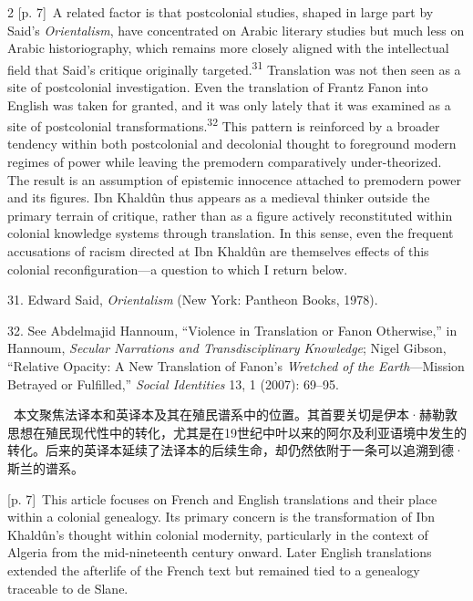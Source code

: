 \documentclass[10pt,a4paper]{article}
\begin{document}
\begin{paracol}{2}
\switchcolumn
{\scriptsize\color{gray} [p. 7]}\ A related factor is that postcolonial studies, shaped in large part by Said’s \textit{Orientalism}, have concentrated on Arabic literary studies but much less on Arabic historiography, which remains more closely aligned with the intellectual field that Said’s critique originally targeted.\nobreak\textsuperscript{31} Translation was not then seen as a site of postcolonial investigation. Even the translation of Frantz Fanon into English was taken for granted, and it was only lately that it was examined as a site of postcolonial transformations.\nobreak\textsuperscript{32} This pattern is reinforced by a broader tendency within both postcolonial and decolonial thought to foreground modern regimes of power while leaving the premodern comparatively under-theorized. The result is an assumption of epistemic innocence attached to premodern power and its figures. Ibn Khaldûn thus appears as a medieval thinker outside the primary terrain of critique, rather than as a figure actively reconstituted within colonial knowledge systems through translation. In this sense, even the frequent accusations of racism directed at Ibn Khaldûn are themselves effects of this colonial reconfiguration—a question to which I return below.\par{\small 31. Edward Said, \textit{Orientalism} (New York: Pantheon Books, 1978).\par}{\small 32. See Abdelmajid Hannoum, “Violence in Translation or Fanon Otherwise,” in Hannoum, \textit{Secular Narrations and Transdisciplinary Knowledge}; Nigel Gibson, “Relative Opacity: A New Translation of Fanon’s \textit{Wretched of the Earth}—Mission Betrayed or Fulfilled,” \textit{Social Identities} 13, 1 (2007): 69–95.\par}
\switchcolumn*
{\scriptsize\color{gray} [p. 7]}\ 本文聚焦法译本和英译本及其在殖民谱系中的位置。其首要关切是伊本·赫勒敦思想在殖民现代性中的转化，尤其是在19世纪中叶以来的阿尔及利亚语境中发生的转化。后来的英译本延续了法译本的后续生命，却仍然依附于一条可以追溯到德·斯兰的谱系。\par
\switchcolumn
{\scriptsize\color{gray} [p. 7]}\ This article focuses on French and English translations and their place within a colonial genealogy. Its primary concern is the transformation of Ibn Khaldûn’s thought within colonial modernity, particularly in the context of Algeria from the mid-nineteenth century onward. Later English translations extended the afterlife of the French text but remained tied to a genealogy traceable to de Slane.\par

\end{paracol}
\end{document}
